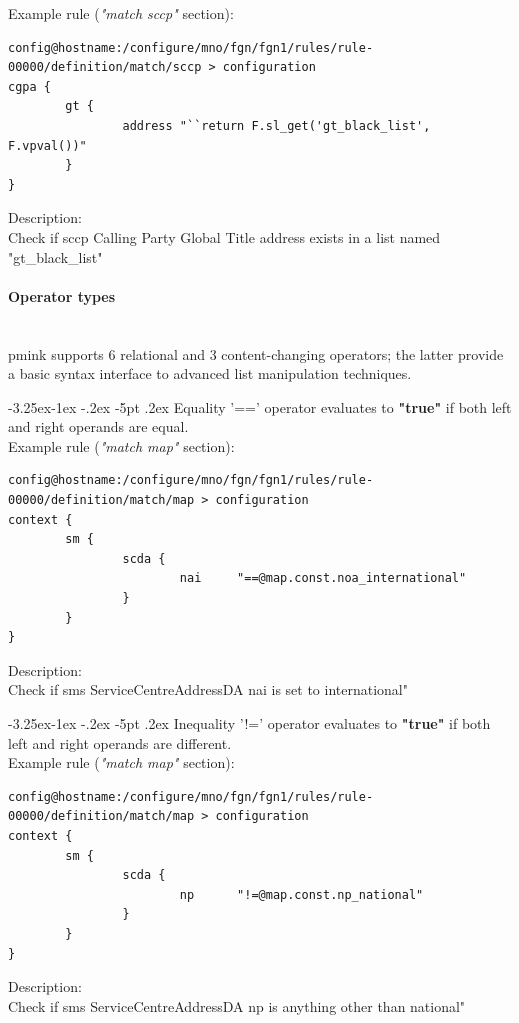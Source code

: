 \documentclass[a4paper,latin]{paper}
\makeatletter
\renewcommand\subparagraph{\@startsection{subparagraph}{5}{\z@}%
                                     {-3.25ex\@plus -1ex \@minus -.2ex}%
                                     {-5pt \@plus .2ex}%
                                     {\normalfont\normalsize\bfseries}}
\makeatother
\begin{document}
\noindent{}Example rule (\textit{"match sccp"} section):
\begin{lstlisting}[style=BashInputStyle, belowskip=\baselineskip, upquote=true]
config@hostname:/configure/mno/fgn/fgn1/rules/rule-00000/definition/match/sccp > configuration 
cgpa {
        gt {
                address "``return F.sl_get('gt_black_list', F.vpval())"
        }                                   
}
\end{lstlisting}
Description:\\
Check if \acrfull{sccp} Calling Party Global Title address exists in a list named "gt\_black\_list"

\paragraph{Operator types}
\mbox{}\\
\acrfull{pmink} supports 6 relational and 3 content-changing operators; the latter provide a basic syntax interface to advanced list manipulation techniques.

\subparagraph{Equality '==' operator}
evaluates to \textbf{"true"} if both left and right operands are equal.\\

\noindent{}Example rule (\textit{"match map"} section):
\begin{lstlisting}[style=BashInputStyle, belowskip=\baselineskip, upquote=true]
config@hostname:/configure/mno/fgn/fgn1/rules/rule-00000/definition/match/map > configuration 
context {
        sm {
                scda {
                        nai     "==@map.const.noa_international"
                }
        }        
}
\end{lstlisting}
Description:\\
Check if \acrfull{sms} ServiceCentreAddressDA \acrfull{nai} is set to international"
\clearpage

\subparagraph{Inequality '!=' operator}
evaluates to \textbf{"true"} if both left and right operands are different.\\

\noindent{}Example rule (\textit{"match map"} section):
\begin{lstlisting}[style=BashInputStyle, belowskip=\baselineskip, upquote=true]
config@hostname:/configure/mno/fgn/fgn1/rules/rule-00000/definition/match/map > configuration 
context {
        sm {
                scda {
                        np      "!=@map.const.np_national"
                }
        }        
}
\end{lstlisting}
Description:\\
Check if \acrfull{sms} ServiceCentreAddressDA \acrfull{np} is anything other than national"
\end{document}
